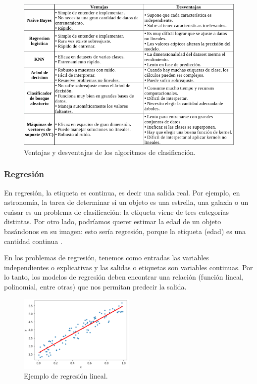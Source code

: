 \documentclass[a4paper,12pt]{article}
\begin{document}
\begin{figure}[H]
	\begin{center}				
	\includegraphics[width=1\textwidth]{tesis_6.png}
  	\caption{Ventajas y desventajas de los algoritmos de clasificación.}
  	\label{fig:proconsclassification.}
  	\end{center}
\end{figure}

\subsubsection{Regresión}

En regresión, la etiqueta es continua, es decir una salida real. Por ejemplo, en astronomía, la tarea de determinar si un objeto es una estrella, una galaxia o un cuásar es un problema de clasificación: la etiqueta viene de tres categorías distintas. Por otro lado, podríamos querer estimar la edad de un objeto basándonos en su imagen: esto sería regresión, porque la etiqueta (edad) es una cantidad continua \citep{GitHubpa25:online}.

En los problemas de regresión, tenemos como entradas las variables independientes o explicativas y las salidas o etiquetas son variables continuas. Por lo tanto, los modelos de regresión deben encontrar una relación (función lineal, polinomial, entre otras) que nos permitan predecir la salida.

\begin{figure}[]
	\begin{center}				
	\includegraphics[width=0.5\textwidth]{tesis_9.png}
  	\caption{Ejemplo de regresión lineal.}
  	\label{fig:regressionlinear.}
  	\end{center}
\end{figure}
\end{document}
